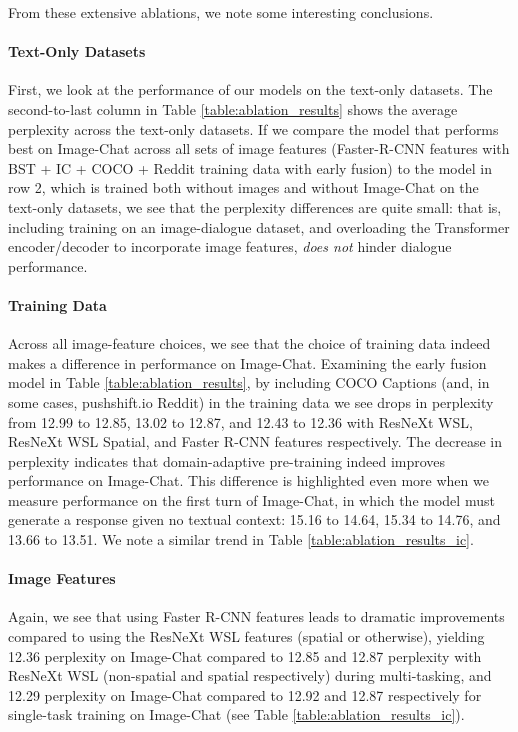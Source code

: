 \documentclass[11pt,a4paper]{article}
\begin{document}
From these extensive ablations, we note some interesting conclusions.


\paragraph{Text-Only Datasets}
First, we look at the performance of our models on the text-only datasets. The second-to-last column in Table \ref{table:ablation_results} shows the average perplexity across the text-only datasets. If we compare the model that performs best on Image-Chat across all sets of image features (Faster-R-CNN features with BST + IC + COCO + Reddit training data with early fusion) to the model in row 2, which is trained both without images and without Image-Chat on the text-only datasets, we see that the perplexity differences are quite small: that is, including training on an image-dialogue dataset, and overloading the Transformer encoder/decoder to incorporate image features, \textit{does not} hinder dialogue performance.

\paragraph{Training Data}
Across all image-feature choices, we see that the choice of training data indeed makes a difference in performance on Image-Chat. Examining the early fusion model in Table \ref{table:ablation_results}, by including COCO Captions (and, in some cases, pushshift.io Reddit) in the training data we see drops in perplexity from 12.99 to 12.85, 13.02 to 12.87, and 12.43 to 12.36 with ResNeXt WSL, ResNeXt WSL Spatial, and Faster R-CNN features respectively. The decrease in perplexity indicates that domain-adaptive pre-training indeed improves performance on Image-Chat. This difference is highlighted even more when we measure performance on the first turn of Image-Chat, in which the model must generate a response given no textual context: 15.16 to 14.64, 15.34 to 14.76, and 13.66 to 13.51.
We note a similar trend in Table \ref{table:ablation_results_ic}.

\paragraph{Image Features}
Again, we see that using Faster R-CNN features leads to dramatic improvements compared to using the ResNeXt WSL features (spatial or otherwise), yielding 12.36 perplexity on Image-Chat compared to 12.85 and 12.87 perplexity with ResNeXt WSL (non-spatial and spatial respectively) during multi-tasking, and 12.29 perplexity on Image-Chat compared to 12.92 and 12.87 respectively for single-task training on Image-Chat (see Table \ref{table:ablation_results_ic}).
\end{document}
